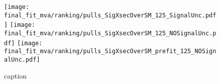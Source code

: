 \begin{figure}[hb]
  \centering
  \texttt{[image: final\_fit\_mva/ranking/pulls\_SigXsecOverSM\_125\_SignalUnc.pdf]}
  \texttt{[image: final\_fit\_mva/ranking/pulls\_SigXsecOverSM\_125\_NOSignalUnc.pdf]}
  \texttt{[image: final\_fit\_mva/ranking/pulls\_SigXsecOverSM\_prefit\_125\_NOSignalUnc.pdf]} \\
  \caption{caption}
  \label{fig:Rank_012L_MVAVH}
\end{figure}